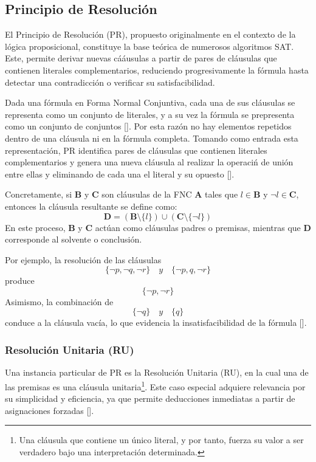 \subsection{Principio de Resoluci\'on}
\label{subsec:prncp-de-res}
El Principio de Resoluci\'on (PR), propuesto originalmente en el contexto de la l\'ogica proposicional, constituye la base te\'orica de numerosos algoritmos SAT. Este, permite derivar nuevas c\'aáusulas a partir de pares de cl\'ausulas que contienen literales complementarios, reduciendo progresivamente la fórmula hasta detectar una contradicci\'on o verificar su satisfacibilidad. 

Dada una f\'ormula en Forma Normal Conjuntiva, cada una de sus cl\'ausulas se representa como un conjunto de literales, y a su vez la f\'ormula se prepresenta como un conjunto de conjuntos [\cite{garcia-satcap}]. Por esta raz\'on no hay elementos repetidos dentro de una cláusula ni en la fórmula completa. Tomando como entrada esta representación, PR identifica pares de cláusulas que contienen literales complementarios y genera una nueva cláusula al realizar la operaci\'n de uni\'on entre ellas y eliminando de cada una el literal y su opuesto [\cite{garcia-satcap}].

Concretamente, si \(\mathbf{B}\) y \(\mathbf{C}\) son cláusulas de la FNC \(\mathbf{A}\) tales que \(l\in\mathbf{B}\) y \(\neg l\in\mathbf{C}\), entonces la cláusula resultante se define como:
\[
\mathbf{D}=(\mathbf{B}\setminus\{l\})\cup(\mathbf{C}\setminus\{\neg l\})
\]
En este proceso, \(\mathbf{B}\) y \(\mathbf{C}\) actúan como cláusulas padres o premisas, mientras que \(\mathbf{D}\) corresponde al solvente o conclusión.

Por ejemplo, la resolución de las cláusulas
\[
\{\neg p,\neg q,\neg r\}\quad y\quad\{\neg p,q,\neg r\}
\]
produce
\[
\{\neg p,\neg r\}
\]
Asimismo, la combinación de
\[
\{\neg q\}\quad y\quad\{q\}
\]
conduce a la cláusula vacía, lo que evidencia la insatisfacibilidad de la fórmula [\cite{garcia-satcap}].

\subsubsection{Resoluci\'on Unitaria (RU)}
\label{subsubsec:res-unit}
Una instancia particular de PR es la Resoluci\'on Unitaria (RU), en la cual una de las premisas es una cl\'ausula unitaria\footnote{Una cl\'ausula que contiene un \'unico literal, y por tanto, fuerza su valor a ser verdadero bajo una interpretaci\'on determinada.}. Este caso especial adquiere relevancia por su simplicidad y eficiencia, ya que permite deducciones inmediatas a partir de asignaciones forzadas [\cite{garcia-satcap}].

